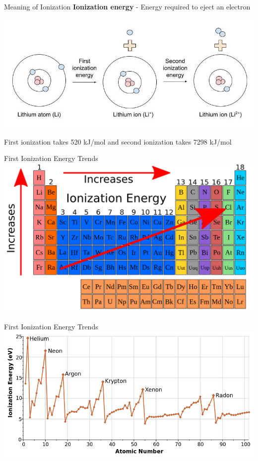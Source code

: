 \documentclass[11pt]{beamer}
\begin{document}
\begin{frame}{Meaning of Ionization}
  \textbf{Ionization energy} - Energy required to eject an electron
  
  \begin{center}
    \includegraphics[width=0.8\linewidth]{ionization_Li}
  \end{center}

  First ionization takes 520 kJ/mol and second ionization takes
  7298 kJ/mol

\end{frame}

\begin{frame}{First Ionization Energy Trends}
  \centering
  \includegraphics[width=\linewidth]{ion_trends}
\end{frame}

\begin{frame}{First Ionization Energy Trends}
  \centering
  \includegraphics[width=\linewidth]{first-ionization-energy}
\end{frame}
\end{document}
